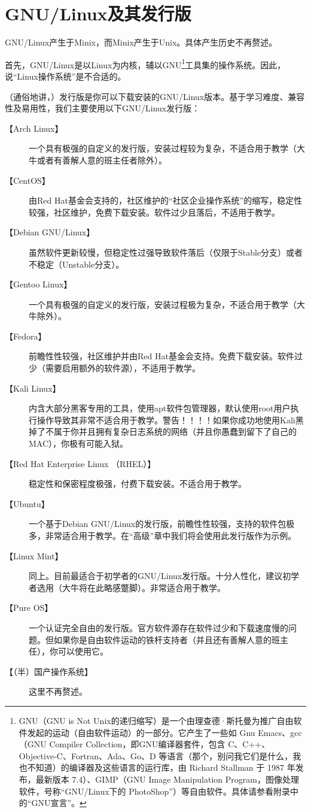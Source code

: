 \section{GNU/Linux及其发行版}
\label{sec:gnulinux} GNU/Linux产生于Minix，而Minix产生于Unix。具体产生历史不再赘述。\par
首先，GNU/Linux是以Linux为内核，辅以GNU\footnote{GNU（GNU is Not Unix的递归缩写）是一个由理查德·斯托曼为推广自由软件发起的运动（自由软件运动）的一部分。它产生了一些如 Gnu Emacs、gcc（GNU Compiler Collection，即GNU编译器套件，包含 C、C++、Objective-C、Fortran、Ada、Go、D 等语言（那个，别问我它们是什么，我也不知道）的编译器及这些语言的运行库，由 Richard Stallman 于 1987 年发布，最新版本 7.4）、GIMP（GNU Image Manipulation Program，图像处理软件，号称“GNU/Linux下的 PhotoShop”）等自由软件。具体请参看附录中的“GNU宣言”。}工具集的操作系统。因此，说“Linux操作系统”是不合适的。\par
（通俗地讲，）发行版是你可以下载安装的GNU/Linux版本。基于学习难度、兼容性及易用性，我们主要使用以下GNU/Linux发行版：
\begin{description}
	\item [【Arch Linux】] 一个具有极强的自定义的发行版，安装过程较为复杂，不适合用于教学（大牛或者有善解人意的班主任者除外）。
	\item [【CentOS】] 由Red Hat基金会支持的，社区维护的“社区企业操作系统”的缩写，稳定性较强，社区维护，免费下载安装。软件过少且落后，不适用于教学。
	\item [【Debian GNU/Linux】] 虽然软件更新较慢，但稳定性过强导致软件落后（仅限于Stable分支）或者不稳定（Unstable分支）。
	\item [【Gentoo Linux】] 一个具有极强的自定义的发行版，安装过程极为复杂，不适合用于教学（大牛除外）。
	\item [【Fedora】] 前瞻性性较强，社区维护并由Red Hat基金会支持。免费下载安装。软件过少（需要启用额外的软件源），不适用于教学。
	\item [【Kali Linux】] 内含大部分黑客专用的工具，使用apt软件包管理器，默认使用root用户执行操作导致其非常不适合用于教学。{\color{red}警告！！！！如果你成功地使用Kali黑掉了不属于你并且拥有复杂日志系统的网络（并且你愚蠢到留下了自己的MAC），你极有可能入狱。}
	\item [【Red Hat Enterprise Linux （RHEL）】] 稳定性和保密程度极强，付费下载安装。不适合用于教学。
	\item [【Ubuntu】] 一个基于Debian GNU/Linux的发行版，前瞻性性较强，支持的软件包极多，非常适合用于教学。在“高级”章中我们将会使用此发行版作为示例。
	\item [【Linux Mint】] 同上。目前最适合于初学者的GNU/Linux发行版。十分人性化，建议初学者选用（大牛将在此略感蹩脚）。非常适合用于教学。
	\item [【Pure OS】] 一个认证完全自由的发行版。官方软件源存在软件过少和下载速度慢的问题。但如果你是自由软件运动的铁杆支持者（并且还有善解人意的班主任），你可以使用它。
	\item [【（半）国产操作系统】]这里不再赘述。
\end{description}
